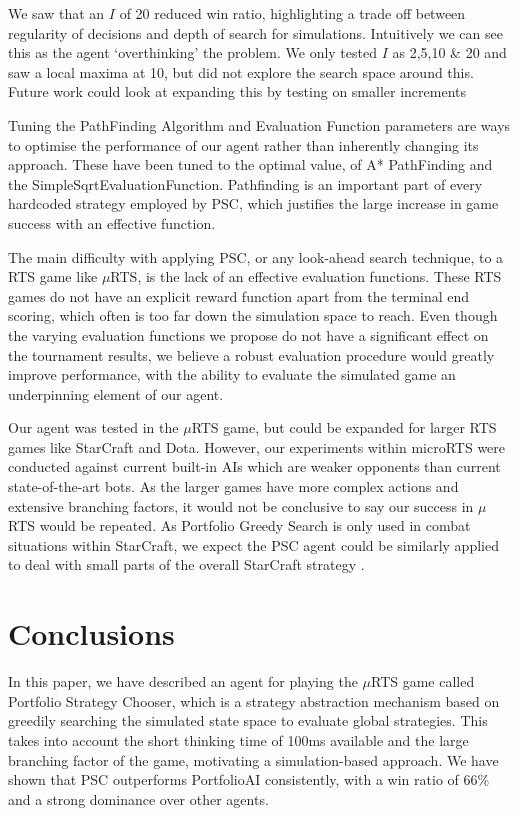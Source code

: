 \documentclass[]{article}
\begin{document}
We saw that an $I$ of 20 reduced win ratio, highlighting a trade off between regularity of decisions and depth of search for simulations. Intuitively we can see this as the agent ‘overthinking’ the problem. We only tested $I$ as 2,5,10 \& 20 and saw a local maxima at 10, but did not explore the search space around this. Future work could look at expanding this by testing on smaller increments

Tuning the PathFinding Algorithm and Evaluation Function parameters are ways to optimise the performance of our agent rather than inherently changing its approach. These have been tuned to the optimal value, of A* PathFinding and the SimpleSqrtEvaluationFunction. Pathfinding is an important part of every hardcoded strategy employed by PSC, which justifies the large increase in game success with an effective function.

The main difficulty with applying PSC, or any look-ahead search technique, to a RTS game like $\mu$RTS, is the lack of an effective evaluation functions. These RTS games do not have an explicit reward function apart from the terminal end scoring, which often is too far down the simulation space to reach. Even though the varying evaluation functions we propose do not have a significant effect on the tournament results, we believe a robust evaluation procedure would greatly improve performance, with the ability to evaluate the simulated game an underpinning element of our agent.
 
Our agent was tested in the $\mu$RTS game, but could be expanded for larger RTS games like StarCraft and Dota. However, our experiments within microRTS were conducted against current built-in AIs which are weaker opponents than current state-of-the-art bots. As the larger games have more complex actions and extensive branching factors, it would not be conclusive to say our success in $\mu$RTS would be repeated. As Portfolio Greedy Search is only used in combat situations within StarCraft, we expect the PSC agent could be similarly applied to deal with small parts of the overall StarCraft strategy \cite{churchill2013portfolio}.

\section{Conclusions}


In this paper, we have described an agent for playing the $\mu$RTS game called Portfolio Strategy Chooser, which is a strategy abstraction mechanism based on greedily searching the simulated state space to evaluate global strategies. This takes into account the short thinking time of 100ms available and the large branching factor of the game, motivating a simulation-based approach. We have shown that PSC outperforms PortfolioAI consistently, with a win ratio of 66\% and a strong dominance over other agents.
\end{document}
